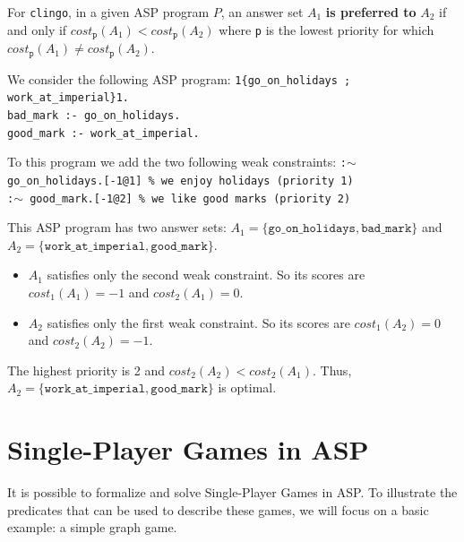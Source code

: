 \smallskip

For \texttt{clingo}, in a given ASP program $P$, an answer set $A_1$ \textbf{is preferred to} $A_2$ if and only if $cost_{\texttt{p}}(A_1)<cost_{\texttt{p}}(A_2)$ where \texttt{p} is the lowest priority for which $cost_{\texttt{p}}(A_1)\neq cost_{\texttt{p}}(A_2)$.

\begin{example}
We consider the following ASP program:\newline
\texttt{1\{go\_on\_holidays ; work\_at\_imperial\}1.\\
bad\_mark :- go\_on\_holidays.\\
good\_mark :- work\_at\_imperial.}

\smallskip

To this program we add the two following weak constraints:\newline
\texttt{:$\sim$ go\_on\_holidays.[-1@1] \% we enjoy holidays (priority 1)\\
:$\sim$ good\_mark.[-1@2] \% we like good marks (priority 2)}

\smallskip

This ASP program has two answer sets: $A_1 = \{ \texttt{go\_on\_holidays}, \texttt{bad\_mark}\}$ and $A_2 = \{ \texttt{work\_at\_imperial}, \texttt{good\_mark} \}$. 

\begin{itemize}
\item $A_1$ satisfies only the second weak constraint. So its scores are $cost_1(A_1)=-1$ and $cost_2(A_1)=0$.
\item $A_2$ satisfies only the first weak constraint. So its scores are $cost_1(A_2)=0$ and $cost_2(A_2)=-1$.
\end{itemize}

The highest priority is 2 and $cost_2(A_2)<cost_2(A_1)$. Thus, $A_2=\{ \texttt{work\_at\_imperial}, \texttt{good\_mark} \}$ is optimal.

\end{example}



\section{Single-Player Games in ASP}

It is possible to formalize and solve Single-Player Games in ASP. To illustrate the predicates that can be used to describe these games, we will focus on a basic example: a simple graph game.

